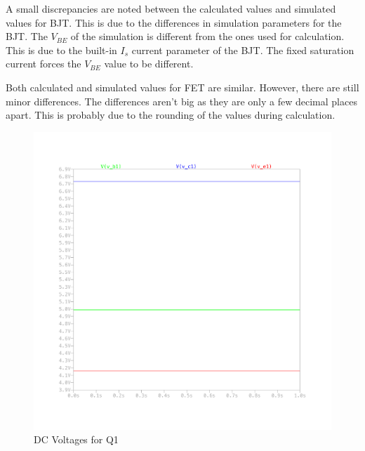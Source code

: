 \documentclass{article}
\begin{document}
A small discrepancies are noted between the calculated values and simulated values for BJT.
This is due to the differences in simulation parameters for the BJT.
The $V_{BE}$ of the simulation is different from the ones used for calculation.
This is due to the built-in $I_{s}$ current parameter of the BJT.
The fixed saturation current forces the $V_{BE}$ value to be different.

Both calculated and simulated values for FET are similar.
However, there are still minor differences.
The differences aren't big as they are only a few decimal places apart.
This is probably due to the rounding of the values during calculation.

\begin{figure}[H]
    \centering
    \includegraphics[height=0.4\textheight,trim={30mm 30mm 30mm 30mm}]{img/Amplifier Design Q1 V.pdf}
    \caption{DC Voltages for Q1}
    \label{fig:dc-v-q1}
\end{figure}
\end{document}
